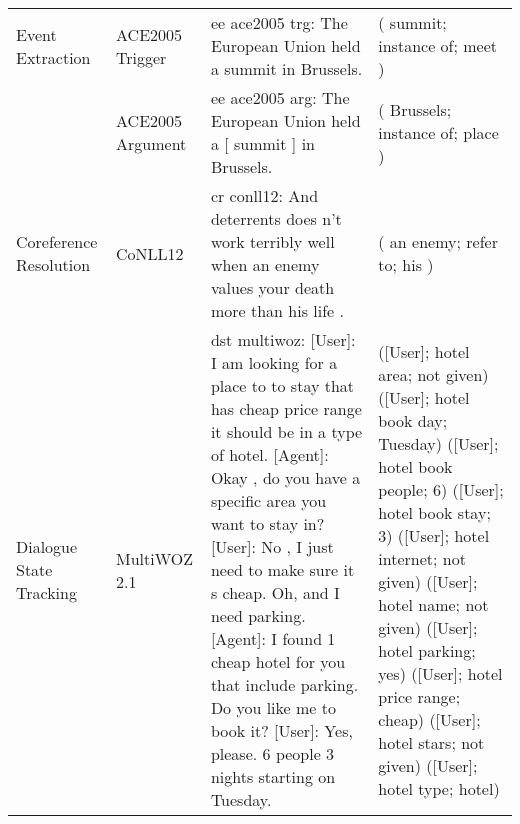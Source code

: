 \begin{table*}[]
{\begin{tabular}{@{}p{2.7cm}lp{10.5cm}p{10.5cm}@{}}
Event Extraction                     & ACE2005 Trigger  & \quad ee ace2005 trg: The European Union held a {\color{black} summit} in Brussels.
                                                        & ( {\color{orange} summit}; instance of; {\color{orange} meet} )
                                                        \\
                                     & ACE2005 Argument & \quad ee ace2005 arg: The European Union held a [ summit ] in {\color{black} Brussels}.
                                                        & ( {\color{orange} Brussels}; instance of; {\color{orange} place} )
                                                        \\ \midrule
Coreference Resolution               & CoNLL12          & \quad cr conll12: And deterrents does n't work terribly well when {\color{black} an enemy} values your death more than {\color{black} his} life .
                                                        & ( {\color{orange} an enemy}; refer to; {\color{orange} his} )
                                                        \\ \midrule
Dialogue State Tracking              & MultiWOZ 2.1     & \quad dst multiwoz: [User]: I am looking for a place to to stay that has {\color{black}cheap} {\color{black}price range} it should be in a {\color{black}type} of {\color{black}hotel}. [Agent]: Okay , do you have a specific area you want to stay in? [User]: No , I just need to make sure it s cheap. Oh, and I {\color{black}need parking}. [Agent]: I found 1 cheap hotel for you that include parking. Do you like me to book it? [User]: Yes, please. {\color{black}6} {\color{black}people} {\color{black}3} nights starting on {\color{black}Tuesday}.               
                                                        &   ([User]; {\color{black}hotel area}; {\color{orange}not given}) ([User]; {\color{black}hotel book day}; {\color{orange}Tuesday}) ([User]; {\color{black}hotel book people}; {\color{orange}6}) ([User]; {\color{black}hotel book stay}; {\color{orange}3}) ([User]; {\color{black}hotel internet}; {\color{orange}not given}) ([User]; {\color{black}hotel name}; {\color{orange}not given}) ([User]; {\color{black}hotel parking}; {\color{orange}yes}) ([User]; {\color{black}hotel price range}; {\color{orange}cheap}) ([User]; {\color{black}hotel stars}; {\color{orange}not given}) ([User]; {\color{black}hotel type}; {\color{orange}hotel})
              

\end{tabular}}
\end{table*}
